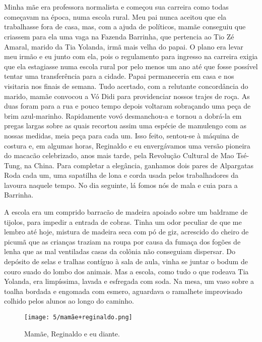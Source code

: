 \chapter{}
Minha mãe era professora normalista e começou sua carreira como todas começavam na época, numa escola rural. 
Meu pai nunca aceitou que ela trabalhasse fora de casa, mas, com a ajuda de políticos, mamãe conseguiu que criassem para ela uma vaga na Fazenda Barrinha, que pertencia ao Tio Zé Amaral, marido da Tia Yolanda, irmã mais velha do papai. 
O plano era levar  meu irmão e eu junto com ela, pois o regulamento para ingresso na carreira exigia que ela estagiasse numa escola rural por pelo menos um ano até que fosse possível tentar uma transferência para a cidade. 
Papai permaneceria em casa e nos visitaria nos finais de semana. 
Tudo acertado, com a relutante concordância do marido, mamãe convocou a Vó Didi para providenciar nossos trajes de roça. 
As duas foram para a rua e pouco tempo depois voltaram sobraçando uma peça de brim azul-marinho. 
Rapidamente vovó desmanchou-a e tornou a dobrá-la em pregas largas sobre as quais recortou assim uma espécie de mamulengo com as nossas medidas, meia peça para cada um. 
Isso feito, sentou-se à máquina de costura e, em algumas horas, Reginaldo e eu envergávamos uma versão pioneira do macacão celebrizado, anos mais tarde, pela Revolução Cultural de Mao Tsé-Tung, na China. 
Para completar a elegância, ganhamos dois pares de Alpargatas Roda cada um, uma sapatilha de lona e corda usada pelos trabalhadores da lavoura naquele tempo. 
No dia seguinte, lá fomos nós de mala e cuia para a Barrinha.
                     
A escola era um comprido barracão de madeira apoiado sobre um baldrame de tijolos, para impedir a entrada de cobras. 
Tinha um odor peculiar de que me lembro até hoje, mistura de madeira seca com pó de giz, acrescido do cheiro de picumã que as crianças traziam na roupa por causa da fumaça dos fogões de lenha que as mal ventiladas casas da colônia não conseguiam dispersar. 
Do depósito de selas e tralhas contíguo à sala de aula, vinha se juntar o bodum de couro suado do lombo dos animais. 
Mas a escola, como tudo o que rodeava Tia Yolanda, era limpíssima, lavada e esfregada com soda. Na mesa, um vaso sobre a toalha bordada e engomada com esmero, aguardava o ramalhete improvisado colhido pelos alunos ao longo do caminho.  


\begin{figure}[H]
\centering
\texttt{[image: 5/mamãe+reginaldo.png]}
\caption{Mamãe, Reginaldo e eu diante.}
\end{figure}

